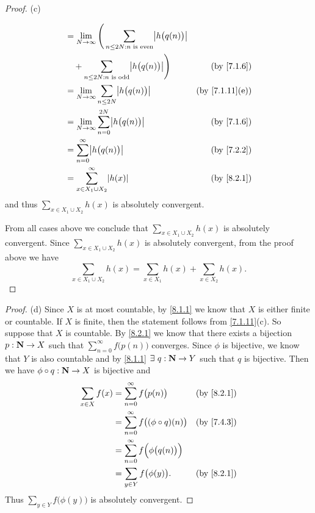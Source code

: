 \begin{proof}{(c)}
\begin{itemize}
\begin{align*}
             & = \lim_{N \to \infty} \Bigg(\sum_{n \leq 2N : n \text{ is even}} \abs{h\big(q(n)\big)}                                                             \\
             & \quad + \sum_{n \leq 2N : n \text{ is odd}} \abs{h\big(q(n)\big)}\Bigg)                                             & \text{(by \cref{7.1.6})}     \\
             & = \lim_{N \to \infty} \sum_{n \leq 2N} \abs{h\big(q(n)\big)}                                                        & \text{(by \cref{7.1.11}(e))} \\
             & = \lim_{N \to \infty} \sum_{n = 0}^{2N} \abs{h\big(q(n)\big)}                                                       & \text{(by \cref{7.1.6})}     \\
             & = \sum_{n = 0}^\infty \abs{h\big(q(n)\big)}                                                                         & \text{(by \cref{7.2.2})}     \\
             & = \sum_{x \in X_1 \cup X_2}^\infty \abs{h(x)}                                                                       & \text{(by \cref{8.2.1})}
          \end{align*}
          and thus \(\sum_{x \in X_1 \cup X_2} h(x)\) is absolutely convergent.
  \end{itemize}
  From all cases above we conclude that \(\sum_{x \in X_1 \cup X_2} h(x)\) is absolutely convergent.
  Since \(\sum_{x \in X_1 \cup X_2} h(x)\) is absolutely convergent, from the proof above we have
  \[
    \sum_{x \in X_1 \cup X_2} h(x) = \sum_{x \in X_1} h(x) + \sum_{x \in X_2} h(x).
  \]
\end{proof}

\begin{proof}{(d)}
  Since \(X\) is at most countable, by \cref{8.1.1} we know that \(X\) is either finite or countable.
  If \(X\) is finite, then the statement follows from \cref{7.1.11}(c).
  So suppose that \(X\) is countable.
  By \cref{8.2.1} we know that there exists a bijection \(p : \mathbf{N} \to X\) such that \(\sum_{n = 0}^\infty f\big(p(n)\big)\) converges.
  Since \(\phi\) is bijective, we know that \(Y\) is also countable and by \cref{8.1.1} \(\exists\ q : \mathbf{N} \to Y\) such that \(q\) is bijective.
  Then we have \(\phi \circ q : \mathbf{N} \to X\) is bijective and
  \begin{align*}
    \sum_{x \in X} f(x) & = \sum_{n = 0}^\infty f\big(p(n)\big)               & \text{(by \cref{8.2.1})} \\
                        & = \sum_{n = 0}^\infty f\big((\phi \circ q)(n)\big)  & \text{(by \cref{7.4.3})} \\
                        & = \sum_{n = 0}^\infty f\Big(\phi\big(q(n)\big)\Big)                            \\
                        & = \sum_{y \in Y} f\big(\phi(y)\big).                & \text{(by \cref{8.2.1})}
  \end{align*}
  Thus \(\sum_{y \in Y} f\big(\phi(y)\big)\) is absolutely convergent.
\end{proof}

